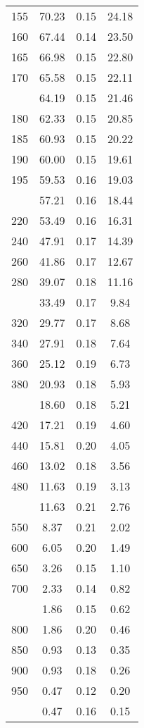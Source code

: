 \begin{table}[ht]
\begin{tabular}{lccc}
  155 & 70.23 & 0.15 & 24.18 \\ 
  160 & 67.44 & 0.14 & 23.50 \\ 
  165 & 66.98 & 0.15 & 22.80 \\ 
  170 & 65.58 & 0.15 & 22.11 \\ 
   \addlinespace
175 & 64.19 & 0.15 & 21.46 \\ 
  180 & 62.33 & 0.15 & 20.85 \\ 
  185 & 60.93 & 0.15 & 20.22 \\ 
  190 & 60.00 & 0.15 & 19.61 \\ 
  195 & 59.53 & 0.16 & 19.03 \\ 
   \addlinespace
200 & 57.21 & 0.16 & 18.44 \\ 
  220 & 53.49 & 0.16 & 16.31 \\ 
  240 & 47.91 & 0.17 & 14.39 \\ 
  260 & 41.86 & 0.17 & 12.67 \\ 
  280 & 39.07 & 0.18 & 11.16 \\ 
   \addlinespace
300 & 33.49 & 0.17 & 9.84 \\ 
  320 & 29.77 & 0.17 & 8.68 \\ 
  340 & 27.91 & 0.18 & 7.64 \\ 
  360 & 25.12 & 0.19 & 6.73 \\ 
  380 & 20.93 & 0.18 & 5.93 \\ 
   \addlinespace
400 & 18.60 & 0.18 & 5.21 \\ 
  420 & 17.21 & 0.19 & 4.60 \\ 
  440 & 15.81 & 0.20 & 4.05 \\ 
  460 & 13.02 & 0.18 & 3.56 \\ 
  480 & 11.63 & 0.19 & 3.13 \\ 
   \addlinespace
500 & 11.63 & 0.21 & 2.76 \\ 
  550 & 8.37 & 0.21 & 2.02 \\ 
  600 & 6.05 & 0.20 & 1.49 \\ 
  650 & 3.26 & 0.15 & 1.10 \\ 
  700 & 2.33 & 0.14 & 0.82 \\ 
   \addlinespace
750 & 1.86 & 0.15 & 0.62 \\ 
  800 & 1.86 & 0.20 & 0.46 \\ 
  850 & 0.93 & 0.13 & 0.35 \\ 
  900 & 0.93 & 0.18 & 0.26 \\ 
  950 & 0.47 & 0.12 & 0.20 \\ 
   \addlinespace
1000 & 0.47 & 0.16 & 0.15 \\ 
   \bottomrule
\end{tabular}
\end{table}
